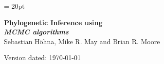 \documentclass[11pt]{article}
\begin{document}
\renewcommand{\headrulewidth}{0.5pt}
\headsep = 20pt
\lhead{ }

\thispagestyle{plain}
\begin{center}

\textbf{\LARGE Phylogenetic Inference using \RevBayes}\\\vspace{2mm}
\textbf{\it{\Large MCMC algorithms}}\\\vspace{2mm}
\vspace{1cm}
{\Large Sebastian H{\"o}hna, Mike R. May and Brian R. Moore }
\vspace{1cm}
\end{center}

\def \ResourcePath {./}
\def \GlobalResourcePath {../}


Version dated: \today
\end{document}
